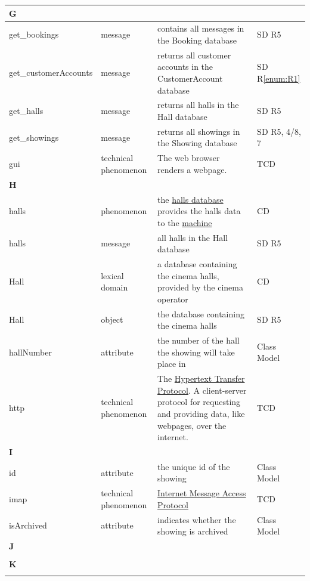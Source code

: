 \documentclass[a4paper,10pt,titlepage,bibtotoc,bibtotocnumbered]{scrreprt}
\begin{document}
\begin{longtable}{|p{4.75cm}|p{3cm}|p{5cm}|l|}
\hline
\multicolumn{4}{|l|}{\textbf{G}}\\
\hline
get\_bookings & message & contains all messages in the Booking database & SD R5\\
\hline
get\_customerAccounts & message & returns all customer accounts in the CustomerAccount database & SD R\ref{enum:R1}\\
\hline
get\_halls & message & returns all halls in the Hall database & SD R5\\
\hline
get\_showings & message & returns all showings in the Showing database & SD R5, 4/8, 7\\
\hline
gui & technical phenomenon & The web browser renders a webpage. & TCD\\
\hline
\multicolumn{4}{|l|}{\textbf{H}}\\
\hline
\hypertarget{glossary:halls}{halls} & phenomenon & the \hyperlink{glossary:Hall}{halls database} provides the halls data to the \hyperlink{glossary:UDEKino}{machine} & CD\\
\hline
halls & message & all halls in the Hall database & SD R5\\
\hline
\hypertarget{glossary:Hall}{Hall} & lexical domain & a database containing the cinema halls, provided by the cinema operator & CD\\
\hline
Hall & object & the database containing the cinema halls & SD R5\\
\hline
hallNumber & attribute & the number of the hall the showing will take place in & Class Model\\
\hline
http & technical phenomenon & The \href{https://datatracker.ietf.org/doc/html/rfc9112}{Hypertext Transfer Protocol}. A client-server protocol for requesting and providing data, like webpages, over the internet. & TCD\\
\hline
\multicolumn{4}{|l|}{\textbf{I}}\\
\hline
id & attribute & the unique id of the showing & Class Model\\
\hline
imap & technical phenomenon & \href{https://tools.ietf.org/html/rfc3501}{Internet Message Access Protocol} & TCD\\
\hline
isArchived & attribute & indicates whether the showing is archived & Class Model\\
\hline
\multicolumn{4}{|l|}{\textbf{J}}\\
\hline
&  &  & \\
\hline
\multicolumn{4}{|l|}{\textbf{K}}\\
\hline
&  &  & \\

\end{longtable}
\end{document}
